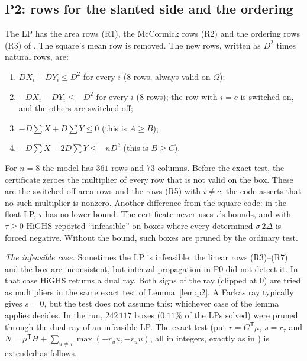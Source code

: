 \documentclass[11pt]{amsart}
\theoremstyle{definition}
\newcommand{\Om}{\Omega}
\begin{document}
\subsection{P2: rows for the slanted side and the ordering}
The LP has the area rows (R1), the McCormick rows (R2) and the ordering rows (R3) of \cite[App.~A]{N9}. The square's mean row is removed. The new rows, written as $D^2$ times natural rows, are:
\begin{enumerate}[label=(R\arabic*),start=4]
\item $DX_i + DY_i \le D^2$ for every $i$ ($8$ rows, always valid on $\Om$);
\item $-DX_i - DY_i \le -D^2$ for every $i$ ($8$ rows); the row with $i = c$ is switched on, and the others are switched off;
\item $-D\sum X + D\sum Y \le 0$ (this is $A \ge B$);
\item $-D\sum X - 2D\sum Y \le -nD^2$ (this is $B \ge C$).
\end{enumerate}
For $n = 8$ the model has $361$ rows and $73$ columns. Before the exact test, the certificate zeroes the multiplier of every row that is not valid on the box. These are the switched-off area rows and the rows (R5) with $i \ne c$; the code asserts that no such multiplier is nonzero. Another difference from the square code: in the float LP, $\tau$ has no lower bound. The certificate never uses $\tau$'s bounds, and with $\tau \ge 0$ HiGHS reported ``infeasible'' on boxes where every determined $\sigma\,2\Delta$ is forced negative. Without the bound, such boxes are pruned by the ordinary test. %

\emph{The infeasible case.} Sometimes the LP is infeasible: the linear rows (R3)--(R7) and the box are inconsistent, but interval propagation in P0 did not detect it. In that case HiGHS returns a dual ray. Both signs of the ray (clipped at $0$) are tried as multipliers in the same exact test of Lemma~\ref{lem:p2}. A Farkas ray typically gives $s = 0$, but the test does not assume this: whichever case of the lemma applies decides. In the run, $242\,117$ boxes ($0.11\%$ of the LPs solved) were pruned through the dual ray of an infeasible LP. %
The exact test (put $r = G^{\mathsf T}\mu$, $s = r_\tau$ and $N = \mu^{\mathsf T}H + \sum_{u\ne\tau}\max(-r_u\underline u, -r_u\overline u)$, all in integers, exactly as in \cite[App.~A.4]{N9}) is extended as follows.
\end{document}

